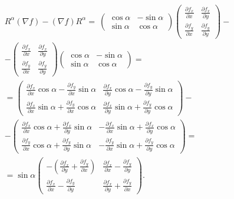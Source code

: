 \documentclass{article}
\begin{document}
\begin{multline}
\label{formula:ugly_commutant}
  R^\alpha (\nabla f) - (\nabla f) R^\alpha =\
  \begin{pmatrix} 
    \cos \alpha & -\sin \alpha \\ 
    \sin \alpha & \cos \alpha 
  \end{pmatrix} 
  \begin{pmatrix} 
    \frac{\partial f_x}{\partial x} & \frac{\partial f_x}{\partial y} \\
    \frac{\partial f_y}{\partial x} & \frac{\partial f_y}{\partial y} 
  \end{pmatrix} - \\
  - \begin{pmatrix} 
    \frac{\partial f_x}{\partial x} & \frac{\partial f_x}{\partial y} \\
    \frac{\partial f_y}{\partial x} & \frac{\partial f_y}{\partial y} 
  \end{pmatrix}
  \begin{pmatrix} 
    \cos \alpha & -\sin \alpha \\
    \sin \alpha & \cos \alpha 
  \end{pmatrix} = \\
  = \begin{pmatrix}
    \frac{\partial f_x}{\partial x} \cos \alpha - \frac{\partial f_y}{\partial x} \sin \alpha &
    \frac{\partial f_x}{\partial y} \cos \alpha - \frac{\partial f_y}{\partial y} \sin \alpha \\
    \frac{\partial f_x}{\partial x} \sin \alpha + \frac{\partial f_y}{\partial x} \cos \alpha &
    \frac{\partial f_x}{\partial y} \sin \alpha + \frac{\partial f_y}{\partial y} \cos \alpha 
  \end{pmatrix} - \\
  - \begin{pmatrix} 
    \frac{\partial f_x}{\partial x} \cos \alpha + \frac{\partial f_x}{\partial y} \sin \alpha &
    - \frac{\partial f_x}{\partial x} \sin \alpha + \frac{\partial f_x}{\partial y} \cos \alpha \\
    \frac{\partial f_y}{\partial x} \cos \alpha + \frac{\partial f_y}{\partial y} \sin \alpha &
    - \frac{\partial f_y}{\partial x} \sin \alpha + \frac{\partial f_y}{\partial y} \cos \alpha 
  \end{pmatrix} = \\
  = \sin \alpha \begin{pmatrix}
    -(\frac{\partial f_x}{\partial y} + \frac{\partial f_y}{\partial x}) &
    \frac{\partial f_x}{\partial x} - \frac{\partial f_y}{\partial y} \\
    \frac{\partial f_x}{\partial x} - \frac{\partial f_y}{\partial y} &
    \frac{\partial f_x}{\partial y} + \frac{\partial f_y}{\partial x} 
  \end{pmatrix}.
\end{multline}
\end{document}

